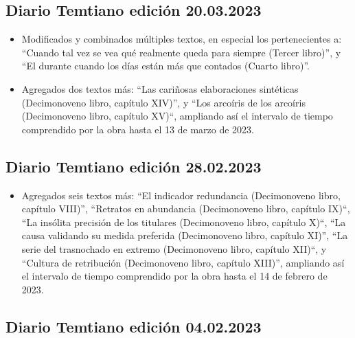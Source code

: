 \documentclass[
]{book}
\providecommand{\tightlist}{%
  \setlength{\itemsep}{0pt}\setlength{\parskip}{0pt}}
\begin{document}
\hypertarget{diario-temtiano-ediciuxf3n-20.03.2023}{%
\subsection*{Diario Temtiano edición 20.03.2023}\label{diario-temtiano-ediciuxf3n-20.03.2023}}

\begin{itemize}
\item
  Modificados y combinados múltiples textos, en especial los pertenecientes a: ``Cuando tal vez se vea qué realmente queda para siempre (Tercer libro)'', y ``El durante cuando los días están más que contados (Cuarto libro)''.
\item
  Agregados dos textos más: ``Las cariñosas elaboraciones sintéticas (Decimonoveno libro, capítulo XIV)'', y ``Los arcoíris de los arcoíris (Decimonoveno libro, capítulo XV)``, ampliando así el intervalo de tiempo comprendido por la obra hasta el 13 de marzo de 2023.
\end{itemize}

\hypertarget{diario-temtiano-ediciuxf3n-28.02.2023}{%
\subsection*{Diario Temtiano edición 28.02.2023}\label{diario-temtiano-ediciuxf3n-28.02.2023}}

\begin{itemize}
\tightlist
\item
  Agregados seis textos más: ``El indicador redundancia (Decimonoveno libro, capítulo VIII)'', ``Retratos en abundancia (Decimonoveno libro, capítulo IX)``, ``La insólita precisión de los titulares (Decimonoveno libro, capítulo X)``, ``La causa validando su medida preferida (Decimonoveno libro, capítulo XI)'', ``La serie del trasnochado en extremo (Decimonoveno libro, capítulo XII)``, y ``Cultura de retribución (Decimonoveno libro, capítulo XIII)'', ampliando así el intervalo de tiempo comprendido por la obra hasta el 14 de febrero de 2023.
\end{itemize}

\hypertarget{diario-temtiano-ediciuxf3n-04.02.2023}{%
\subsection*{Diario Temtiano edición 04.02.2023}\label{diario-temtiano-ediciuxf3n-04.02.2023}}
\end{document}
